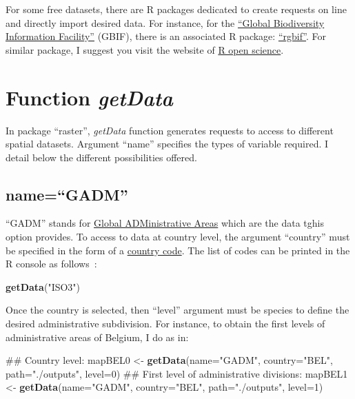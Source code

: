 \documentclass[]{report}
\newenvironment{Shaded}{\begin{snugshade}}{\end{snugshade}}
\newcommand{\KeywordTok}[1]{\textcolor[rgb]{0.13,0.29,0.53}{\textbf{{#1}}}}
\newcommand{\DataTypeTok}[1]{\textcolor[rgb]{0.13,0.29,0.53}{{#1}}}
\newcommand{\DecValTok}[1]{\textcolor[rgb]{0.00,0.00,0.81}{{#1}}}
\newcommand{\StringTok}[1]{\textcolor[rgb]{0.31,0.60,0.02}{{#1}}}
\newcommand{\NormalTok}[1]{{#1}}
\begin{document}
For some free datasets, there are R packages dedicated to create
requests on line and directly import desired data. For instance, for the
\href{\%22http://www.gbif.org\%22}{``Global Biodiversity Information
Facility''} (GBIF), there is an associated R package:
\href{http://cran.r-project.org/web/packages/rgbif/index.html}{``rgbif''}.
For similar package, I suggest you visit the website of
\href{https://ropensci.org/packages/}{R open science}.

\section{\texorpdfstring{Function
\emph{getData}}{Function getData}}\label{function-getdata}

In package ``raster'', \emph{getData} function generates requests to
access to different spatial datasets. Argument ``name'' specifies the
types of variable required. I detail below the different possibilities
offered.

\subsection{\texorpdfstring{name=``GADM''}{name=GADM}}\label{namegadm}

``GADM'' stands for \href{http://www.gadm.org}{Global ADMinistrative
Areas} which are the data tghis option provides. To access to data at
country level, the argument ``country'' must be specified in the form of
a \href{https://en.wikipedia.org/wiki/ISO_3166-1_alpha-3}{country code}.
The list of codes can be printed in the R console as follows~:

\begin{Shaded}
\begin{Highlighting}[]
\KeywordTok{getData}\NormalTok{(}\StringTok{"ISO3"}\NormalTok{)}
\end{Highlighting}
\end{Shaded}

Once the country is selected, then ``level'' argument must be species to
define the desired administrative subdivision. For instance, to obtain
the first levels of administrative areas of Belgium, I do as in:

\begin{Shaded}
\begin{Highlighting}[]
\NormalTok{## Country level:}
\NormalTok{mapBEL0 <-}\StringTok{ }\KeywordTok{getData}\NormalTok{(}\DataTypeTok{name=}\StringTok{"GADM"}\NormalTok{, }\DataTypeTok{country=}\StringTok{"BEL"}\NormalTok{, }\DataTypeTok{path=}\StringTok{"./outputs"}\NormalTok{, }\DataTypeTok{level=}\DecValTok{0}\NormalTok{)}
\NormalTok{## First level of administrative divisions:}
\NormalTok{mapBEL1 <-}\StringTok{ }\KeywordTok{getData}\NormalTok{(}\DataTypeTok{name=}\StringTok{"GADM"}\NormalTok{, }\DataTypeTok{country=}\StringTok{"BEL"}\NormalTok{, }\DataTypeTok{path=}\StringTok{"./outputs"}\NormalTok{, }\DataTypeTok{level=}\DecValTok{1}\NormalTok{)}
\end{Highlighting}
\end{Shaded}
\end{document}
